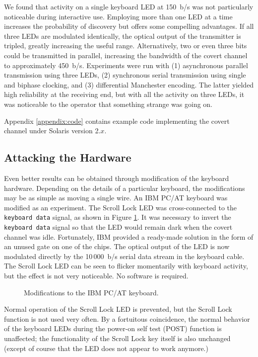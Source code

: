 \documentclass{acmtrans2e}
\begin{document}
We found that activity on a single keyboard LED at 150~b/s was not 
particularly noticeable during interactive use.  Employing more than one 
LED at a time increases the probability of discovery but offers some
compelling
advantages.  If all three LEDs are modulated identically, the optical 
output of the transmitter is tripled, greatly increasing the useful 
range.  Alternatively, two or even three bits could be transmitted in 
parallel, increasing the bandwidth of the covert channel to 
approximately 450~b/s.  Experiments were run with (1) asynchronous parallel 
transmission using three LEDs, (2) synchronous serial transmission using
single and biphase clocking, and (3) differential Manchester 
encoding.  The latter yielded high reliability at the receiving end, but 
with all the activity on three LEDs, it was noticeable to the 
operator that something strange was going on.

Appendix \ref{appendix:code} contains example code implementing the covert
channel under Solaris version 2.$x$.

\subsection{Attacking the Hardware}

Even better results can be obtained through modification of the keyboard 
hardware.  Depending on the details of a particular keyboard, the 
modifications may be as simple as moving a single wire.  An IBM PC/AT 
keyboard was modified as an experiment.  The Scroll Lock LED was
cross-connected to the {\tt keyboard data} signal, as shown in Figure 
\ref{keyboard_cross_connect_figure}.  It was necessary to invert the {\tt
keyboard data} signal so that the LED would remain dark when the covert 
channel was idle.  Fortunately, IBM provided a ready-made 
solution in the form of an unused gate on one of the chips.  The optical 
output of the LED is now modulated directly by the 10\,000~b/s
serial data stream in the keyboard cable.  The Scroll Lock LED can be 
seen to flicker momentarily with keyboard activity, but the effect is
not very noticeable.  No software is required.

\begin{figure}
\centering
\caption{Modifications to the IBM PC/AT keyboard.}
\label{keyboard_cross_connect_figure}
\end{figure}

Normal operation of the Scroll Lock LED is prevented, but the Scroll Lock
function is not used very often.  By a fortuitous coincidence, the normal 
behavior of the keyboard LEDs during the power-on self test (POST)
function is unaffected; the functionality of the Scroll Lock key itself
is also unchanged (except of course that the LED does not appear to work
anymore.)
\end{document}
